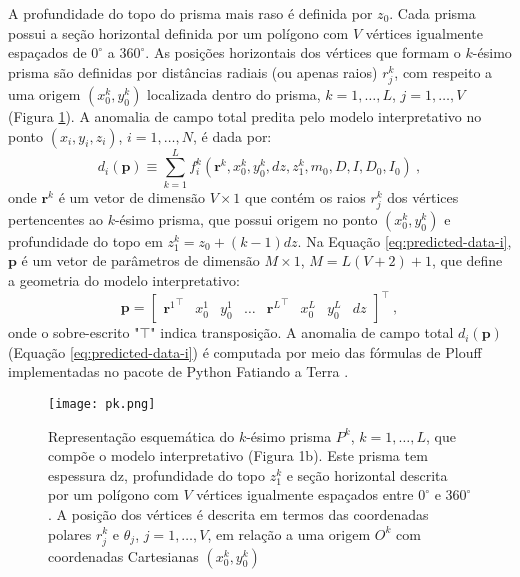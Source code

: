A profundidade do topo do prisma mais raso é definida por $z_{0}$.
Cada prisma possui a seção horizontal definida por um polígono com $V$ vértices igualmente espaçados de $0^{\circ}$ a $360^{\circ}$.
As posições horizontais dos vértices que formam o $k$-ésimo prisma
são definidas por distâncias radiais (ou apenas raios) $r^{k}_{j}$, com respeito a uma origem $(x_{0}^{k}, y_{0}^{k})$ localizada dentro do prisma, $k = 1, \dots, L$, $j = 1, \dots, V$ (Figura \ref{fig:pk}).
A anomalia de campo total predita pelo modelo interpretativo no ponto $(x_{i}, y_{i}, z_{i})$, $i = 1, \dots, N$, é dada por:
\begin{equation}
d_{i} (\mathbf{p}) \equiv \sum\limits_{k=1}^{L} f_{i}^{k}(\mathbf{r}^{k}, x_{0}^{k}, y_{0}^{k}, dz, z_{1}^{k}, m_{0}, D, I, D_{0}, I_{0}) \: ,
\label{eq:predicted-data-i}
\end{equation}
onde $\mathbf{r}^{k}$ é um vetor de dimensão $V \times 1$ que contém os raios $r^{k}_{j}$ dos vértices pertencentes ao $k$-ésimo prisma, que possui origem no ponto $(x_{0}^{k}, y_{0}^{k})$ e profundidade do topo em $z_{1}^{k} = z_{0} + (k-1)dz$.
Na Equação \ref{eq:predicted-data-i}, $\mathbf{p}$ é um vetor de parâmetros de dimensão $M \times 1$, $ M=L(V+2) +1 $, que define a geometria do modelo interpretativo:
\begin{equation}
\mathbf{p} = \begin{bmatrix} 
{\mathbf{r}^{1}}^{\top} & x_{0}^{1} & y_{0}^{1} & \dots & 
{\mathbf{r}^{L}}^{\top} & x_{0}^{L} & y_{0}^{L} & dz
\end{bmatrix}^{\top} \: ,
\label{eq:p-vector}
\end{equation}
onde o sobre-escrito "$\top$" indica transposição.
A anomalia de campo total $d_{i} (\mathbf{p})$ 
(Equação \ref{eq:predicted-data-i}) é computada por meio das fórmulas de Plouff \citep{plouff1976} implementadas no pacote de Python 
Fatiando a Terra \citep{uieda-etal2013}.

\begin{figure}[!htb]
	\centering
	\texttt{[image: pk.png]}
	\caption{Representação esquemática do $k$-ésimo prisma $P^k$, $k=1,\dots, L$, que compõe o modelo interpretativo (Figura 1b). Este prisma tem espessura dz, profundidade do topo $z_1^k$ e seção horizontal descrita por um polígono com $V$ vértices igualmente espaçados entre $0^{\circ}$ e $360^{\circ}$. A posição dos vértices é descrita em termos das coordenadas polares $r_j^k$ e $\theta_j$, $j=1,\dots, V$, em relação a uma origem $O^k$ com coordenadas Cartesianas $(x_0^k, y_0^k)$}
	\label{fig:pk}
\end{figure}

